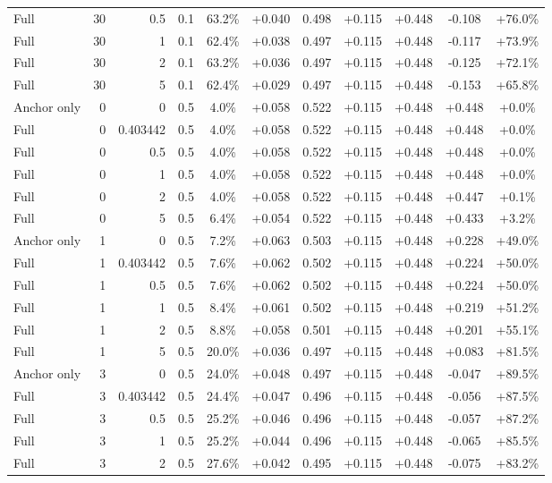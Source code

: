 \begin{table}[htbp]
\begin{tabular}{lrrrccccccc}
Full & 30 & 0.5 & 0.1 & 63.2\% & +0.040 & 0.498 & +0.115 & +0.448 & -0.108 & +76.0\% \\
Full & 30 & 1 & 0.1 & 62.4\% & +0.038 & 0.497 & +0.115 & +0.448 & -0.117 & +73.9\% \\
Full & 30 & 2 & 0.1 & 63.2\% & +0.036 & 0.497 & +0.115 & +0.448 & -0.125 & +72.1\% \\
Full & 30 & 5 & 0.1 & 62.4\% & +0.029 & 0.497 & +0.115 & +0.448 & -0.153 & +65.8\% \\
Anchor only & 0 & 0 & 0.5 & 4.0\% & +0.058 & 0.522 & +0.115 & +0.448 & +0.448 & +0.0\% \\
Full & 0 & 0.403442 & 0.5 & 4.0\% & +0.058 & 0.522 & +0.115 & +0.448 & +0.448 & +0.0\% \\
Full & 0 & 0.5 & 0.5 & 4.0\% & +0.058 & 0.522 & +0.115 & +0.448 & +0.448 & +0.0\% \\
Full & 0 & 1 & 0.5 & 4.0\% & +0.058 & 0.522 & +0.115 & +0.448 & +0.448 & +0.0\% \\
Full & 0 & 2 & 0.5 & 4.0\% & +0.058 & 0.522 & +0.115 & +0.448 & +0.447 & +0.1\% \\
Full & 0 & 5 & 0.5 & 6.4\% & +0.054 & 0.522 & +0.115 & +0.448 & +0.433 & +3.2\% \\
Anchor only & 1 & 0 & 0.5 & 7.2\% & +0.063 & 0.503 & +0.115 & +0.448 & +0.228 & +49.0\% \\
Full & 1 & 0.403442 & 0.5 & 7.6\% & +0.062 & 0.502 & +0.115 & +0.448 & +0.224 & +50.0\% \\
Full & 1 & 0.5 & 0.5 & 7.6\% & +0.062 & 0.502 & +0.115 & +0.448 & +0.224 & +50.0\% \\
Full & 1 & 1 & 0.5 & 8.4\% & +0.061 & 0.502 & +0.115 & +0.448 & +0.219 & +51.2\% \\
Full & 1 & 2 & 0.5 & 8.8\% & +0.058 & 0.501 & +0.115 & +0.448 & +0.201 & +55.1\% \\
Full & 1 & 5 & 0.5 & 20.0\% & +0.036 & 0.497 & +0.115 & +0.448 & +0.083 & +81.5\% \\
Anchor only & 3 & 0 & 0.5 & 24.0\% & +0.048 & 0.497 & +0.115 & +0.448 & -0.047 & +89.5\% \\
Full & 3 & 0.403442 & 0.5 & 24.4\% & +0.047 & 0.496 & +0.115 & +0.448 & -0.056 & +87.5\% \\
Full & 3 & 0.5 & 0.5 & 25.2\% & +0.046 & 0.496 & +0.115 & +0.448 & -0.057 & +87.2\% \\
Full & 3 & 1 & 0.5 & 25.2\% & +0.044 & 0.496 & +0.115 & +0.448 & -0.065 & +85.5\% \\
Full & 3 & 2 & 0.5 & 27.6\% & +0.042 & 0.495 & +0.115 & +0.448 & -0.075 & +83.2\% \\

\end{tabular}
\end{table}
